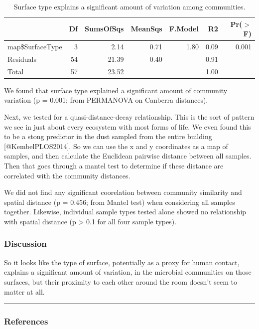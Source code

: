 \begin{table}[ht]
\centering
\begin{tabular}{lrrrrrr}
  \hline
 & Df & SumsOfSqs & MeanSqs & F.Model & R2 & Pr($>$F) \\ 
  \hline
map\$SurfaceType & 3 & 2.14 & 0.71 & 1.80 & 0.09 & 0.001 \\ 
  Residuals & 54 & 21.39 & 0.40 &  & 0.91 &  \\ 
  Total & 57 & 23.52 &  &  & 1.00 &  \\ 
   \hline
\end{tabular}
\caption{Surface type explains a significant amount of variation among communities.} 
\end{table}

We found that surface type explained a significant amount of community
variation (p = 0.001; from PERMANOVA on Canberra distances).

Next, we tested for a quasi-distance-decay relationship. This is the
sort of pattern we see in just about every ecosystem with most forms of
life. We even found this to be a stong predictor in the dust sampled
from the entire building {[}@KembelPLOS2014{]}. So we can use the x and
y coordinates as a map of samples, and then calculate the Euclidean
pairwise distance between all samples. Then that goes through a mantel
test to determine if these distance are correlated with the community
distances.

We did not find any significant coorelation between community similarity
and spatial distance (p = 0.456; from Mantel test) when considering all
samples together. Likewise, individual sample types tested alone showed
no relationship with spatial distance (p \textgreater{} 0.1 for all four
sample types).

\subsubsection{Discussion}

So it looks like the type of surface, potentially as a proxy for human
contact, explains a significant amount of variation, in the microbial
communities on those surfaces, but their proximity to each other around
the room doesn't seem to matter at all.

\clearpage

\begin{center}\rule{3in}{0.4pt}\end{center}

\subsubsection{References}
